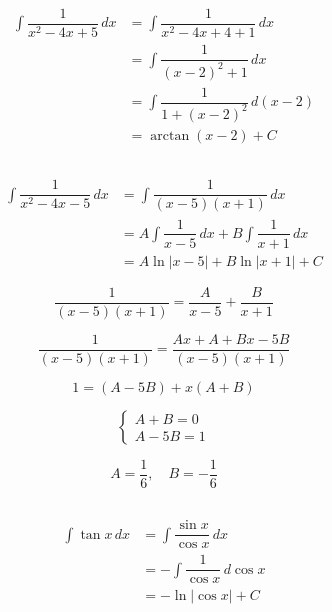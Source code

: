\documentclass{scrartcl}
\begin{document}
\begin{align*}
\displaystyle \int \dfrac{1}{x^2-4x+5}\,dx
&= \int \dfrac{1}{x^2-4x+4 + 1} \,dx\\
&= \int \dfrac{1}{(x-2)^2 + 1} \,dx\\
&= \int \dfrac{1}{1+(x-2)^2} \,d(x-2)\\
&= \arctan{(x-2)} + C
\end{align*}

\subsection{}

\begin{align*}
\displaystyle \int \dfrac{1}{x^2-4x-5}\,dx
&= \int \dfrac{1}{(x-5)(x+1)} \,dx\\
&= A \int \dfrac{1}{x-5} \,dx + B \int \dfrac{1}{x+1} \,dx\\
&= A\ln|x-5| + B\ln|x+1| + C
\end{align*}

\begin{FlushLeft}
\end{FlushLeft}

$$\dfrac{1}{(x-5)(x+1)} = \dfrac{A}{x-5} + \dfrac{B}{x+1}$$

$$\dfrac{1}{(x-5)(x+1)} = \dfrac{Ax + A + Bx - 5B}{(x-5)(x+1)}$$

$$1 = (A-5B) + x(A+B)$$

$$
\begin{cases}
A+B=0 \\
A-5B=1
\end{cases}
$$

$$A = \dfrac{1}{6},\quad B = -\dfrac{1}{6}$$

\subsection{}

\begin{align*}
\displaystyle \int \tan{x}\,dx
&= \int \dfrac{\sin{x}}{\cos{x}} \,dx\\
&= -\int \dfrac{1}{\cos{x}} \,d\cos{x}\\
&= -\ln{|\cos{x}|} + C
\end{align*}

\subsection{}
\end{document}
